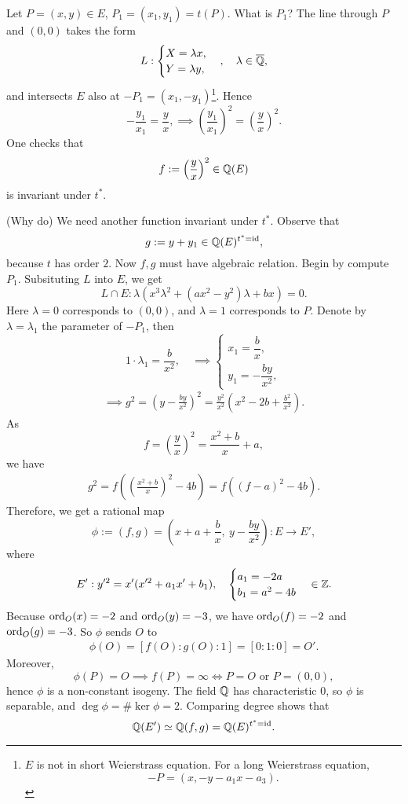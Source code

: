 Let $P = (x, y)\in E$, $P_1 = (x_1, y_1) = t(P)$.
What is $P_1$? The line through $P$ and $(0, 0)$ takes the form
\[L : \begin{cases}
    X = \lambda x,\\ Y = \lambda y,
\end{cases},\quad \lambda\in\overline{\mathbb{Q}},\]
and intersects $E$ also at $-P_1 = (x_1, -y_1)$\footnote{
    $E$ is not in short Weierstrass equation.
    For a long Weierstrass equation,
    \[-P = \left( x, -y-a_1x-a_3 \right).\]
}.
Hence \[-\frac{y_1}{x_1} = \frac{y}{x},\implies \left( \frac{y_1}{x_1} \right)^2 = \left( \frac{y }{x } \right)^2.\]
One checks that \[f := \left( \frac{y }{x } \right)^2\in \mathbb{Q}(E)\]is invariant under $t^*$.

(Why do) We need another function invariant under $t^*$.
Observe that \[g := y + y_1\in\mathbb{Q}(E)^{t^* = \operatorname{id}},\]
because $t$ has order $2$.
Now $f, g$ must have algebraic relation.
Begin by compute $P_1$.
Subsituting $L$ into $E$,
we get \[L\cap E : \lambda(x^3\lambda^2 + (ax^2 - y^2)\lambda + bx) = 0.\]
Here $\lambda = 0$ corresponds to $(0, 0)$,
and $\lambda = 1$ corresponds to $P$.
Denote by $\lambda = \lambda_1$ the parameter of $-P_1$,
then \[1\cdot \lambda_1 = \dfrac{b }{x^2},
\quad\implies\begin{cases}
    x_1 = \dfrac{b }{x},\\ y_1 = -\dfrac{by}{x^2},
\end{cases}\]
\begin{align*}
    \implies g^2 = \left( y - \frac{by}{x^2} \right)^2
    = \frac{y^2}{x^2}\left( x^2 - 2b + \frac{b^2}{x^2} \right).
\end{align*}
As \[f = \left( \frac{y}{x} \right)^2 = \frac{x^2+b}{x} + a,\]
we have \begin{align*}
    g^2 = f\left( \left( \frac{x^2+b}{x} \right)^2 - 4b \right) = f\left( (f-a)^2 - 4b \right).
\end{align*}
Therefore, we get a rational map\[\phi := (f, g) = \left( 
    x + a + \frac{b}{x},\ y - \frac{by}{x^2}
 \right) : E\to E',\]
where \[E' : y'^2 = x'(x'^2 + a_1x' + b_1),\quad\begin{cases}
    a_1 = -2a \\ b_1 = a^2 - 4b
\end{cases}\in\mathbb{Z}.\]
Because $\operatorname{ord}_O(x) = -2$ and $\operatorname{ord}_O(y) = -3$, we have $\operatorname{ord}_O(f) = -2$ and $\operatorname{ord}_O(g) = -3$.
So $\phi$ sends $O$ to \begin{align*}
    \phi(O) = \left[ f(O) : g(O) : 1 \right] = [0 : 1 : 0] = O'.
\end{align*}
Moreover, \[\phi(P) = O\implies f(P) = \infty\iff P = O\text{ or } P = (0, 0),\]
hence $\phi$ is a non-constant isogeny.
The field $\mathbb{Q}$ has characteristic $0$, so $\phi$
is separable, and $\deg \phi = \#\ker\phi = 2$.
Comparing degree shows that \[\mathbb{Q}(E')\simeq\mathbb{Q}(f, g) = \mathbb{Q}(E)^{t^* = \operatorname{id}}.\]

